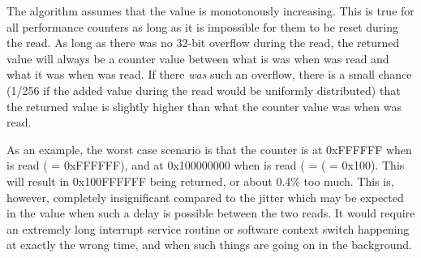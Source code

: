 The algorithm assumes that the value is monotonously increasing. This 
is true for all performance counters as long as it is impossible for them to be 
reset during the read. As long as there was no 32-bit overflow during the read, 
the returned value will always be a counter value between what is was when 
 was read and what it was when  was read. If there 
\emph{was} such an overflow, there is a small chance (1/256 if the added value 
during the read would be uniformly distributed) that the returned value is 
slightly higher than what the counter value was when  was read.

As an example, the worst case scenario is that the counter is at 0xFFFFFF when
 is read ( = 0xFFFFFF), and at 0x100000000 when  is
read ( = ( = 0x100). This will result in 0x100FFFFFF being
returned, or about 0.4\% too much. This is, however, completely insignificant
compared to the jitter which may be expected in the value when such a delay is
possible between the two reads. It would require an extremely long interrupt
service routine or software context switch happening at exactly the wrong time,
and when such things are going on in the background.

